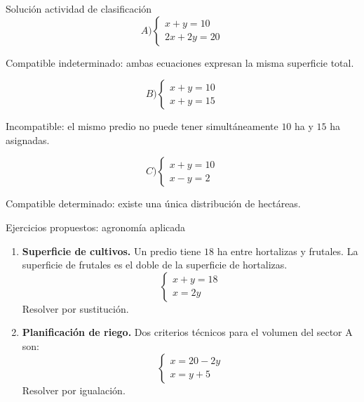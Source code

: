 \documentclass[aspectratio=169]{beamer}
\begin{document}
\begin{frame}{Solución actividad de clasificación}
	\small
	\[
	A)
	\begin{cases}
		x+y=10\\
		2x+2y=20
	\end{cases}
	\]
	
	Compatible indeterminado: ambas ecuaciones expresan la misma superficie total.
	
	\bigskip
	
	\[
	B)
	\begin{cases}
		x+y=10\\
		x+y=15
	\end{cases}
	\]
	
	Incompatible: el mismo predio no puede tener simultáneamente \(10\) ha y \(15\) ha asignadas.
	
	\bigskip
	
	\[
	C)
	\begin{cases}
		x+y=10\\
		x-y=2
	\end{cases}
	\]
	
	Compatible determinado: existe una única distribución de hectáreas.
\end{frame}

\begin{frame}{Ejercicios propuestos: agronomía aplicada}
	\small
	\begin{enumerate}
		\item \textbf{Superficie de cultivos.} Un predio tiene \(18\) ha entre hortalizas y frutales. La superficie de frutales es el doble de la superficie de hortalizas.
		\[
		\begin{cases}
		x+y=18\\
		x=2y
		\end{cases}
		\]
		Resolver por sustitución.
		
		\item \textbf{Planificación de riego.} Dos criterios técnicos para el volumen del sector A son:
		\[
		\begin{cases}
		x=20-2y\\
		x=y+5
		\end{cases}
		\]
		Resolver por igualación.
	\end{enumerate}
\end{frame}
\end{document}
